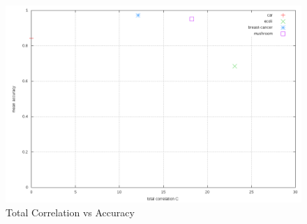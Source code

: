 \documentclass[10pt]{report}
\begin{document}
\begin{figure}
  \begin{center}
	\includegraphics[width=\textwidth,height=!]{correlation}
  \end{center}
  \caption{Total Correlation vs Accuracy}
  \label{fig:correlation}
\end{figure} 

\renewcommand{\bibname}{References}



\end{document}

